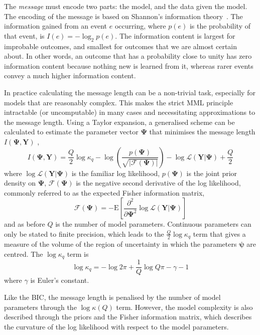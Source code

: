 \documentclass[twocolumn]{aastex62}
\newcommand{\vect}[1]{\boldsymbol{\mathbf{#1}}}
\renewcommand{\vec}[1]{\vect{#1}}
\newcommand{\data}{\textbf{Y}}
\newcommand{\vecdata}{\vec\data}
\newcommand{\likelihood}{\mathcal{L}}
\begin{document}
The \textit{message} must encode two parts: the model, and the data given the
model. The encoding of the message is based on Shannon's information theory~\cite{Shannon:1948}. 
The information gained from an event $e$ occurring, where $p(e)$ is the
probability of that event, is $I(e) = -\log_{2}{p(e)}$. The information content
is largest for improbable outcomes, and smallest for outcomes that we are 
almost certain about. In other words, an outcome that has a probability close
to unity has zero information content because nothing new is learned from it,
whereas rarer events convey a much higher information content. 

In practice calculating the message length can be a non-trivial task, 
especially for models that are reasonably complex. This makes the strict MML
principle intractable (or uncomputable) in many cases and necessitating 
approximations to the message length. Using a Taylor expansion, a generalised
scheme can be calculated to estimate the parameter vector $\vec\Psi$ that
minimises the message length ${I}(\vec\Psi,\vecdata)$ \citep{Wallace:1987},
\begin{equation}
	{I}(\vec\Psi,\vecdata) = \frac{Q}{2}\log\kappa_q - \log\left(\frac{p(\vec\Psi)}{\sqrt{|\mathcal{F}(\vec\Psi)|}}\right) - \log\mathcal{L}\left(\vecdata|\vec\Psi\right) + \frac{Q}{2} \label{eq:mml} 
\end{equation}
\noindent{}where $\log\likelihood(\vecdata|\vec\Psi)$ is the familiar
log likelihood, $p(\vec\Psi)$ is the joint prior density on $\vec\Psi$,
$\mathcal{F}(\vec\Psi)$ is the negative second derivative of the log likelihood,
commonly referred to as the expected Fisher information matrix,
\begin{equation}
	\mathcal{F}(\vec\Psi) = -\textrm{E}\left[\frac{\partial^2}{\partial\vec\Psi^2}\log\likelihood(\vecdata|\vec\Psi)\right]
\end{equation}
\noindent{}and as before $Q$ is the number of model parameters.
Continuous parameters can only be stated to finite precision, which leads
to the $\frac{Q}{2}\log\kappa_q$ term that gives a measure of the volume of the region of
uncertainty in which the parameters $\vec\psi$ are centred. The $\log\kappa_q$
term is
\begin{equation}
	\log\kappa_q = -\log{2\pi} + \frac{1}{Q}\log{Q\pi} - \gamma - 1
\end{equation}
\noindent{}where $\gamma$ is Euler's constant.

Like the BIC, the message length is penalised by the number of model parameters
through the $\log\kappa(Q)$ term. However, the model complexity is also 
described through the priors and the Fisher information matrix, which
describes the curvature of the log likelihood with respect to the model
parameters. 
\end{document}
